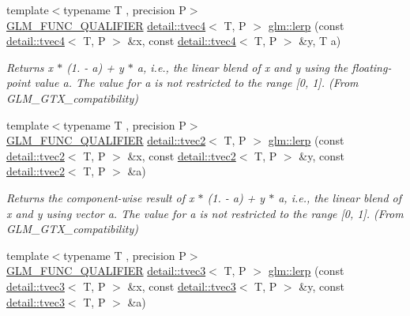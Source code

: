 \begin{DoxyCompactItemize}
{\footnotesize template$<$typename T , precision P$>$ }\\\hyperlink{setup_8hpp_a33fdea6f91c5f834105f7415e2a64407}{G\+L\+M\+\_\+\+F\+U\+N\+C\+\_\+\+Q\+U\+A\+L\+I\+F\+I\+ER} \hyperlink{structglm_1_1detail_1_1tvec4}{detail\+::tvec4}$<$ T, P $>$ \hyperlink{group__gtx__compatibility_ga063de7edddb13ecc44fcfddd9bf38111}{glm\+::lerp} (const \hyperlink{structglm_1_1detail_1_1tvec4}{detail\+::tvec4}$<$ T, P $>$ \&x, const \hyperlink{structglm_1_1detail_1_1tvec4}{detail\+::tvec4}$<$ T, P $>$ \&y, T a)
\begin{DoxyCompactList}\small\item\em Returns x $\ast$ (1. -\/ a) + y $\ast$ a, i.\+e., the linear blend of x and y using the floating-\/point value a. The value for a is not restricted to the range \mbox{[}0, 1\mbox{]}. (From G\+L\+M\+\_\+\+G\+T\+X\+\_\+compatibility) \end{DoxyCompactList}\item 
{\footnotesize template$<$typename T , precision P$>$ }\\\hyperlink{setup_8hpp_a33fdea6f91c5f834105f7415e2a64407}{G\+L\+M\+\_\+\+F\+U\+N\+C\+\_\+\+Q\+U\+A\+L\+I\+F\+I\+ER} \hyperlink{structglm_1_1detail_1_1tvec2}{detail\+::tvec2}$<$ T, P $>$ \hyperlink{group__gtx__compatibility_ga9cc12766a2675ce054a30b0cab4b567b}{glm\+::lerp} (const \hyperlink{structglm_1_1detail_1_1tvec2}{detail\+::tvec2}$<$ T, P $>$ \&x, const \hyperlink{structglm_1_1detail_1_1tvec2}{detail\+::tvec2}$<$ T, P $>$ \&y, const \hyperlink{structglm_1_1detail_1_1tvec2}{detail\+::tvec2}$<$ T, P $>$ \&a)
\begin{DoxyCompactList}\small\item\em Returns the component-\/wise result of x $\ast$ (1. -\/ a) + y $\ast$ a, i.\+e., the linear blend of x and y using vector a. The value for a is not restricted to the range \mbox{[}0, 1\mbox{]}. (From G\+L\+M\+\_\+\+G\+T\+X\+\_\+compatibility) \end{DoxyCompactList}\item 
{\footnotesize template$<$typename T , precision P$>$ }\\\hyperlink{setup_8hpp_a33fdea6f91c5f834105f7415e2a64407}{G\+L\+M\+\_\+\+F\+U\+N\+C\+\_\+\+Q\+U\+A\+L\+I\+F\+I\+ER} \hyperlink{structglm_1_1detail_1_1tvec3}{detail\+::tvec3}$<$ T, P $>$ \hyperlink{group__gtx__compatibility_gaa07546447a0138988802c82cf38aa53d}{glm\+::lerp} (const \hyperlink{structglm_1_1detail_1_1tvec3}{detail\+::tvec3}$<$ T, P $>$ \&x, const \hyperlink{structglm_1_1detail_1_1tvec3}{detail\+::tvec3}$<$ T, P $>$ \&y, const \hyperlink{structglm_1_1detail_1_1tvec3}{detail\+::tvec3}$<$ T, P $>$ \&a)

\end{DoxyCompactItemize}
